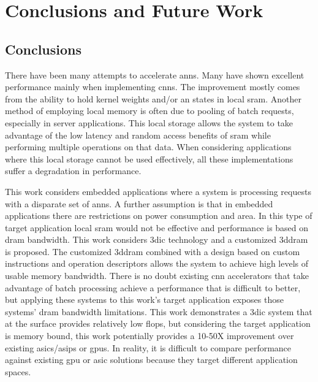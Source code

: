 
\chapter{Conclusions and Future Work}
\label{sec:Conclusions and Future Work}
\label{sec:chap-seven}

\section[Conclusions]{Conclusions}
\label{sec:Conclusions}

There have been many attempts to accelerate \acp{ann}. Many have shown excellent performance mainly when implementing \acp{cnn}. The improvement mostly comes from the ability to hold kernel weights and/or \ac{an} states in local \ac{sram}. 
Another method of employing local memory is often due to pooling of batch requests, especially in server applications.
This local storage allows the system to take advantage of the low latency and random access benefits of \ac{sram} while performing multiple operations on that data.
When considering applications where this local storage cannot be used effectively, all these implementations suffer a degradation in performance.

This work considers embedded applications where a system is processing requests with a disparate set of \acp{ann}. 
A further assumption is that in embedded applications there are restrictions on power consumption and area.
In this type of target application local \ac{sram} would not be effective and performance is based on \ac{dram} bandwidth.
This work considers \acf{3dic} technology and a customized \acf{3ddram} is proposed. 
The customized \ac{3ddram} combined with a design based on custom instructions and operation descriptors allows the system to achieve high levels of usable memory bandwidth.
There is no doubt existing \ac{cnn} accelerators that take advantage of batch processing achieve a performance that is difficult to better, but applying these systems to this work's target application exposes those systems' \ac{dram} bandwidth limitations.
This work demonstrates a \ac{3dic} system that at the surface provides relatively low \ac{flops}, but considering the target application is memory bound, this work potentially provides a 10-50X improvement over existing \acp{asic}/\acp{asip} or \acp{gpu}.
In reality, it is difficult to compare performance against existing \ac{gpu} or \ac{asic} solutions because they target different application spaces. 
\iffalse
given the target application, provides a potentially 10-50X performance improvement over existing ASIC/ASIPs or GPUs.
\fi


